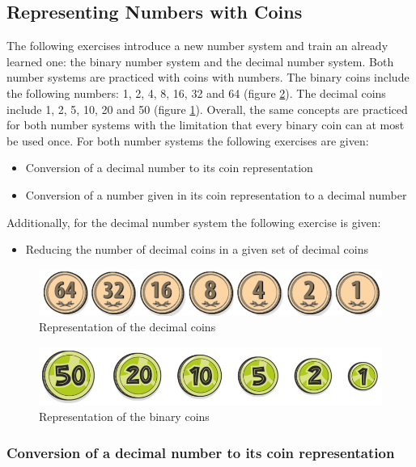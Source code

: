 \subsection*{Representing Numbers with Coins}

The following exercises introduce a new number system and train an already learned one: the binary number system and the decimal number system. Both number systems are practiced with coins with numbers. The binary coins include the following numbers: 1, 2, 4, 8, 16, 32 and 64 (figure \ref{fig:binary_coins}). The decimal coins include 1, 2, 5, 10, 20 and 50 (figure \ref{fig:decimal_coins}). 
Overall, the same concepts are practiced for both number systems with the limitation that every binary coin can at most be used once. For both number systems the following exercises are given:
\begin{itemize}
    \item Conversion of a decimal number to its coin representation
    \item Conversion of a number given in its coin representation to a decimal number
\end{itemize}
Additionally, for the decimal number system the following exercise is given:
\begin{itemize}
    \item Reducing the number of decimal coins in a given set of decimal coins
\end{itemize}

\begin{figure} 
    \centering
    \includegraphics[width=0.5 \columnwidth]{figures/decimal_coins.png}
    \caption{Representation of the decimal coins} 
    \label{fig:decimal_coins} 
\end{figure}

\begin{figure} 
    \centering
    \includegraphics[width=0.5 \columnwidth]{figures/binary_coins.png}
    \caption{Representation of the binary coins} 
    \label{fig:binary_coins} 
\end{figure}

\subsubsection*{Conversion of a decimal number to its coin representation}

